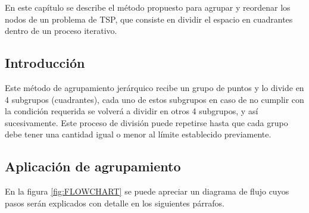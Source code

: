 En este capítulo se describe el método propuesto para agrupar y reordenar los nodos de un problema de TSP, que consiste en dividir el espacio en cuadrantes dentro de un proceso iterativo.

\subsection{Introducción}
    
Este método de agrupamiento jerárquico recibe un grupo de puntos y lo divide en 4 subgrupos (cuadrantes), cada uno de estos subgrupos en caso de no cumplir con la condición requerida se volverá a dividir en otros 4 subgrupos, y así sucesivamente. Este proceso de división puede repetirse hasta que cada grupo debe tener una cantidad igual o menor al límite establecido previamente.

 \subsection{Aplicación de agrupamiento} 
 
En la figura \ref {fig:FLOWCHART} se puede apreciar un diagrama de flujo cuyos pasos serán explicados con detalle en los siguientes párrafos.\\ 

